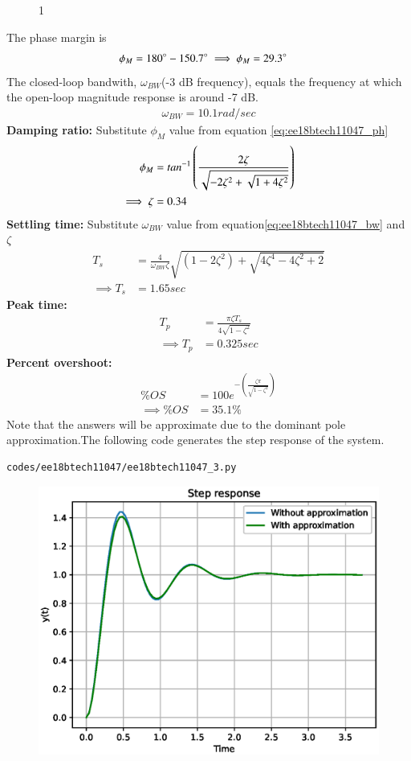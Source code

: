 \begin{enumerate}[label=\thesubsection.\arabic*.,ref=\thesubsection.\theenumi]
\begin{figure}[!ht]
\caption{1}
\label{fig:ee18btech11047_2}
\end{figure}
The phase margin is 
\begin{align}
\phi_{M} &= 180\degree-150.7\degree \implies \phi_{M} = 29.3\degree \label{eq:ee18btech11047_ph}
\end{align}
The closed-loop bandwith, $\omega_{BW}$(-3 dB frequency), equals the frequency at which the open-loop magnitude response is around -7 dB.
\begin{align}
\omega_{BW} = 10.1  rad/sec \label{eq:ee18btech11047_bw}
\end{align}
\textbf{Damping ratio:}
Substitute $\phi_{M}$ value from equation \eqref{eq:ee18btech11047_ph}
\begin{align}
\phi_{M} &= {tan}^{-1}\left(\frac{2\zeta}{\sqrt{-2\zeta^{2}+\sqrt{1+4\zeta^{2}}}}\right)\\
\implies \zeta &= 0.34
\end{align}
\textbf{Settling time:}
Substitute $\omega_{BW}$ value from equation\eqref{eq:ee18btech11047_bw} and $\zeta$
\begin{align}
T_{s}&= \frac{4}{\omega_{BW}\zeta}\sqrt{(1-2\zeta^2)+\sqrt{4\zeta^4-4\zeta^2+2}}\\
\implies T_{s} &= 1.65 sec
\end{align}
\textbf{Peak time:}
\begin{align}
T_{p} &= \frac{\pi\zeta T_{s}}{4\sqrt{1-\zeta^2}}\\
\implies T_{p} &= 0.325 sec
\end{align}
\textbf{Percent overshoot:}
\begin{align}
\% OS&=100e^{-(\frac{\zeta\pi}{\sqrt{1-\zeta^2}})}\\
\implies \% OS &= 35.1 \%
\end{align}
Note that the answers will be approximate due to the dominant pole approximation.The following code generates the step response of the system.
\begin{lstlisting}
codes/ee18btech11047/ee18btech11047_3.py
\end{lstlisting}
\begin{figure}[!ht]
\centering
\includegraphics[width=\columnwidth]{./figs/ee18btech11047/ee18btech11047_3.eps}

\end{figure}
\end{enumerate}
